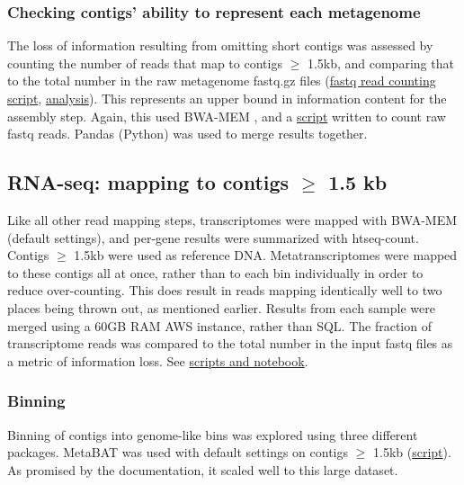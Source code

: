 \subsubsection{Checking contigs' ability to represent each metagenome}
The loss of information resulting from omitting short contigs was assessed by counting the number of reads that map to contigs $\geq$ 1.5kb, and comparing that to the total number in the raw metagenome fastq.gz files (\href{https://github.com/BeckResearchLab/meta4/blob/master/m4b_binning/assembly/data/sample_info/count_reads_in_each_sample.sh}{fastq read counting script}, \href{https://github.com/BeckResearchLab/meta4/tree/master/m4b_binning/assembly/assess_sample_mappings_to_contigs}{analysis}).
This represents an upper bound in information content for the assembly step.
Again, this used BWA-MEM \cite{li2009}, and a \href{https://github.com/BeckResearchLab/meta4/blob/master/m4b_binning/assembly/data/sample_info/count_reads_in_each_sample.sh}{script} written to count raw fastq reads.
Pandas (Python) was used to merge results together.

\subsection{RNA-seq: mapping to contigs $\geq$ 1.5 kb}
Like all other read mapping steps, transcriptomes were mapped with BWA-MEM (default settings), and per-gene results were summarized with htseq-count.
Contigs $\geq$ 1.5kb were used as reference DNA.
Metatranscriptomes were mapped to these contigs all at once, rather than to each bin individually in order to reduce over-counting.
This does result in reads mapping identically well to two places being thrown out, as mentioned earlier.
Results from each sample were merged using a 60GB RAM AWS instance, rather than SQL.
The fraction of transcriptome reads was compared to the total number in the input fastq files as a metric of information loss.
See \href{https://github.com/BeckResearchLab/meta4/tree/master/rnaseq/alignments}{scripts and notebook}.

\subsubsection{Binning}

Binning of contigs into genome-like bins was explored using three different packages.
MetaBAT was used with default settings on contigs $\geq$ 1.5kb (\href{https://github.com/BeckResearchLab/meta4/blob/master/m4b_binning/assembly/2.metabat}{script}).
As promised by the documentation, it scaled well to this large dataset. %

